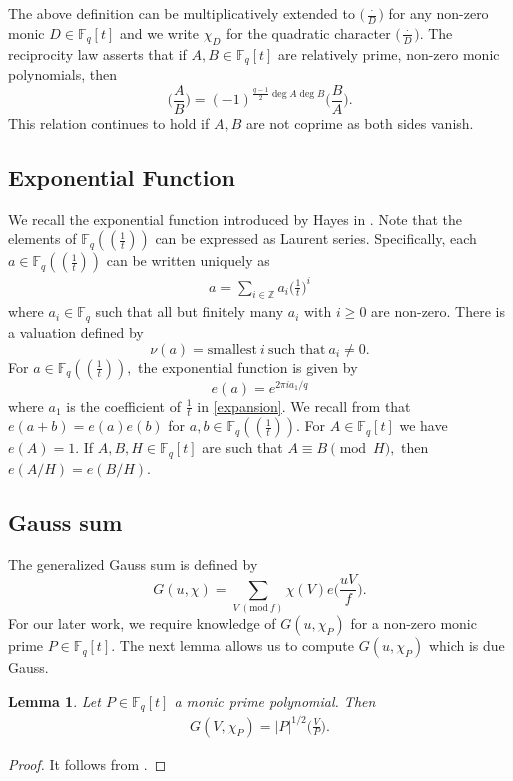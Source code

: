 \documentclass[12pt,reqno]{amsart}
\newcommand{\Mod}[1]{\ (\mathrm{mod}\ #1)}
\newcommand{\Z}{\mathbb{Z}}
\newcommand{\F}{\mathbb{F}}
\newcommand{\BF}{\mathbb{F}}
\newtheorem{lem}{Lemma}[subsection]
\begin{document}
The above definition can be multiplicatively extended to $\Big (\frac{\cdot}{D}\Big)$ for any non-zero monic $D \in \BF_{q}[t]$ and we write $\chi_{D}$ for the quadratic character $\Big ( \frac{\cdot}{D} \Big)$. The reciprocity law asserts that if $A, B \in \BF_{q}[t]$ are relatively prime, non-zero monic polynomials, then 
$$
\Big ( \frac{A}{B} \Big ) = (-1)^{\frac{q-1}{2}\deg A \deg B} \Big ( \frac{B}{A} \Big ). 
$$
This relation continues to hold if $A,B$ are not coprime as both sides vanish. 

\subsection{Exponential Function} We recall the exponential function introduced by Hayes in \cite{Hayes1966}. Note that the elements of $\BF_q((\frac{1}{t}))$ can be expressed as Laurent series. Specifically, each $a \in \BF_{q}((\frac{1}{t}))$ can be written uniquely as
\begin{align}\label{expansion}
a = \sum\limits_{i \in \Z} a_i \Big (\frac{1}{t}\Big)^i
\end{align}
where $a_i \in \BF_q$ such that all but finitely many $a_i$ with $i \geq 0$ are non-zero. There is a valuation defined by
$$
\nu(a) = \text{smallest}\ i \ \text{such that}\ a_i \neq 0.
$$
For $a \in \BF_{q}((\frac{1}{t})),$ the exponential function is given by
$$
e(a)= e^{2\pi i a_1/q}
$$
where $a_1$ is the coefficient of $\frac{1}{t}$ in \eqref{expansion}. We recall from \cite{Hayes1966} that $e(a+b)=e(a)e(b)$ for $a,b \in \BF_{q}((\frac{1}{t})).$ For $A \in \F_q[t]$ we have $e(A)=1.$ If $A,B,H \in \BF_q[t]$ are such that $A \equiv B \pmod H,$ then $e(A/H)= e(B/H).$ 


\subsection{Gauss sum}
The generalized Gauss sum is defined by
$$
G(u,\chi)= \sum\limits_{V \Mod f} \chi(V) e \Big (\frac{uV}{f}\Big ).
$$
For our later work, we require knowledge of $G(u,\chi_P)$ for a non-zero monic prime $P \in \BF_{q}[t]$. The next lemma allows us to compute $G(u,\chi_P)$ which is due Gauss. 
\begin{lem}\label{GaussLemma}
    Let $P \in \BF_{q}[t]$ a monic prime polynomial. Then
    \begin{align*}
        G(V, \chi_{P}) = |P|^{1/2}\Big(\frac{V}{P}\Big ) .
    \end{align*}
\end{lem}
\begin{proof}
   It follows from \cite[Lemma 3.2]{AFlo}.
\end{proof}
\end{document}
